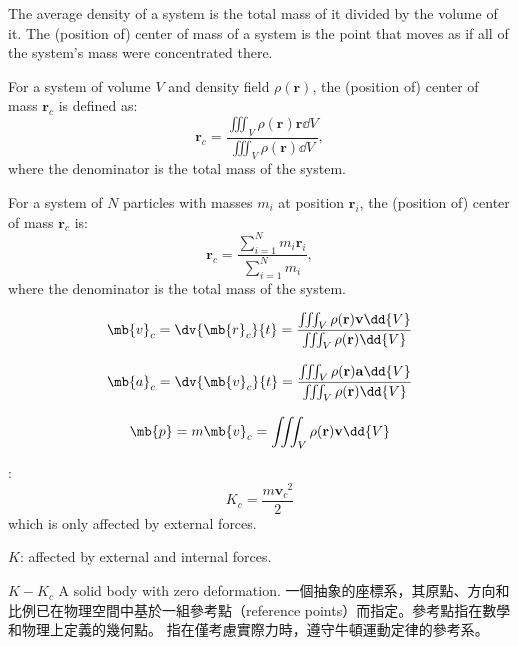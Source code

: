 \documentclass[a4paper,12pt]{article}
\begin{document}
The average density of a system is the total mass of it divided by the volume of it.
The (position of) center of mass of a system is the point that moves as if all of the system's mass were concentrated there.

For a system of volume $V$ and density field $\rho(\mathbf{r})$, the (position of) center of mass $\mathbf{r}_c$ is defined as:
\[\mathbf{r}_c=\frac{\iiint_V\rho(\mathbf{r})\mathbf{r}\dd{V}}{\iiint_V\rho(\mathbf{r})\dd{V}},\]
where the denominator is the total mass of the system.

For a system of $N$ particles with masses $m_i$ at position $\mathbf{r}_i$, the (position of) center of mass $\mathbf{r}_c$ is:
\[\mathbf{r}_c=\frac{\sum_{i=1}^Nm_i\mathbf{r}_i}{\sum_{i=1}^Nm_i},\]
where the denominator is the total mass of the system.
\bit
\item{}
\[\mb{v}_c=\dv{\mb{r}_c}{t}=\frac{\iiint_V\rho(\mathbf{r})\mathbf{v}\dd{V}}{\iiint_V\rho(\mathbf{r})\dd{V}}\]
\item{}
\[\mb{a}_c=\dv{\mb{v}_c}{t}=\frac{\iiint_V\rho(\mathbf{r})\mathbf{a}\dd{V}}{\iiint_V\rho(\mathbf{r})\dd{V}}\]
\item{}
\[\mb{p}=m\mb{v}_c=\iiint_V\rho(\mathbf{r})\mathbf{v}\dd{V}\]
\eit
{}
\bit
\item{}:
  \[K_c=\frac{m\mathbf{v}_c^{\phantom{c}2}}{2}\]
  which is only affected by external forces.
\item{} $K$: affected by external and internal forces.
\item{} $K-K_c$
\eit
{}
A solid body with zero deformation.
一個抽象的座標系，其原點、方向和比例已在物理空間中基於一組參考點（reference points）而指定。參考點指在數學和物理上定義的幾何點。
指在僅考慮實際力時，遵守牛頓運動定律的參考系。
\end{document}
